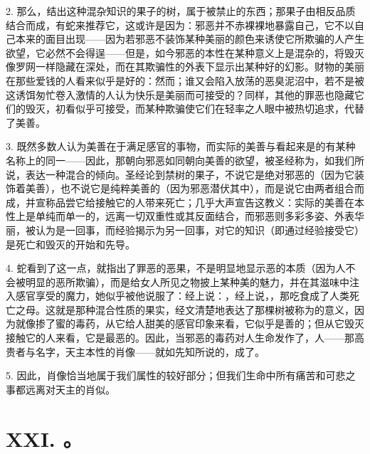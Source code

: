 2. 那么，结出这种混杂知识的果子的树，属于被禁止的东西；那果子由相反品质结合而成，有蛇来推荐它，这或许是因为：邪恶并不赤裸裸地暴露自己，它不以自己本来的面目出现——因为若邪恶不装饰某种美丽的颜色来诱使它所欺骗的人产生欲望，它必然不会得逞——但是，如今邪恶的本性在某种意义上是混杂的，将毁灭像罗网一样隐藏在深处，而在其欺骗性的外表下显示出某种好的幻影。财物的美丽在那些爱钱的人看来似乎是好的：然而；谁又会陷入放荡的恶臭泥沼中，若不是被这诱饵匆忙卷入激情的人认为快乐是美丽而可接受的？同样，其他的罪恶也隐藏它们的毁灭，初看似乎可接受，而某种欺骗使它们在轻率之人眼中被热切追求，代替了美善。\par

3. 既然多数人认为美善在于满足感官的事物，而实际的美善与看起来是的有某种名称上的同一——因此，那朝向邪恶如同朝向美善的欲望，被圣经称为，如我们所说，表达一种混合的倾向。圣经论到禁树的果子，不说它是绝对邪恶的（因为它装饰着美善），也不说它是纯粹美善的（因为邪恶潜伏其中），而是说它由两者组合而成，并宣称品尝它给接触它的人带来死亡；几乎大声宣告这教义：实际的美善在本性上是单纯而单一的，远离一切双重性或其反面结合，而邪恶则多彩多姿、外表华丽，被认为是一回事，而经验揭示为另一回事，对它的知识（即通过经验接受它）是死亡和毁灭的开始和先导。\par

4. 蛇看到了这一点，就指出了罪恶的恶果，不是明显地显示恶的本质（因为人不会被明显的恶所欺骗），而是给女人所见之物披上某种美的魅力，并在其滋味中注入感官享受的魔力，她似乎被他说服了：经上说：，经上说，，那吃食成了人类死亡之母。这就是那种混合性质的果实，经文清楚地表达了那棵树被称为的意义，因为就像掺了蜜的毒药，从它给人甜美的感官印象来看，它似乎是善的；但从它毁灭接触它的人来看，它是最恶的。因此，当邪恶的毒药对人生命发作了，人——那高贵者与名字，天主本性的肖像——就如先知所说的，成了。\par

5. 因此，肖像恰当地属于我们属性的较好部分；但我们生命中所有痛苦和可悲之事都远离对天主的肖似。\par


\section{XXI. 。}

